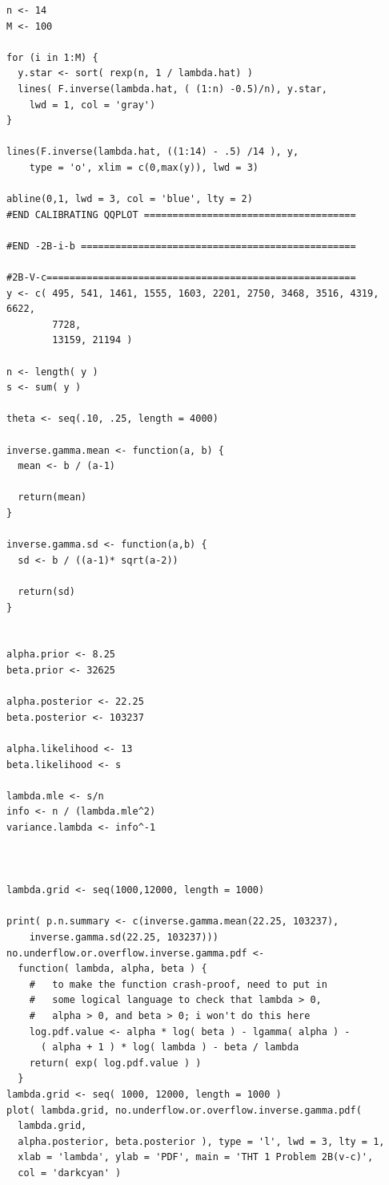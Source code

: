 \documentclass[12pt]{article}
\begin{document}
\begin{lstlisting}
n <- 14
M <- 100

for (i in 1:M) {
  y.star <- sort( rexp(n, 1 / lambda.hat) )
  lines( F.inverse(lambda.hat, ( (1:n) -0.5)/n), y.star, 
    lwd = 1, col = 'gray')
}

lines(F.inverse(lambda.hat, ((1:14) - .5) /14 ), y, 
    type = 'o', xlim = c(0,max(y)), lwd = 3)

abline(0,1, lwd = 3, col = 'blue', lty = 2)
#END CALIBRATING QQPLOT =====================================

#END -2B-i-b ================================================

#2B-V-c======================================================
y <- c( 495, 541, 1461, 1555, 1603, 2201, 2750, 3468, 3516, 4319, 6622, 
        7728,
        13159, 21194 )

n <- length( y )
s <- sum( y )

theta <- seq(.10, .25, length = 4000)

inverse.gamma.mean <- function(a, b) {
  mean <- b / (a-1)
  
  return(mean)
}

inverse.gamma.sd <- function(a,b) {
  sd <- b / ((a-1)* sqrt(a-2))
  
  return(sd)
}


alpha.prior <- 8.25
beta.prior <- 32625

alpha.posterior <- 22.25
beta.posterior <- 103237

alpha.likelihood <- 13
beta.likelihood <- s

lambda.mle <- s/n
info <- n / (lambda.mle^2)
variance.lambda <- info^-1



lambda.grid <- seq(1000,12000, length = 1000)

print( p.n.summary <- c(inverse.gamma.mean(22.25, 103237), 
    inverse.gamma.sd(22.25, 103237)))
no.underflow.or.overflow.inverse.gamma.pdf <-
  function( lambda, alpha, beta ) {
    #   to make the function crash-proof, need to put in
    #   some logical language to check that lambda > 0,
    #   alpha > 0, and beta > 0; i won't do this here
    log.pdf.value <- alpha * log( beta ) - lgamma( alpha ) -
      ( alpha + 1 ) * log( lambda ) - beta / lambda
    return( exp( log.pdf.value ) )
  }
lambda.grid <- seq( 1000, 12000, length = 1000 )
plot( lambda.grid, no.underflow.or.overflow.inverse.gamma.pdf( 
  lambda.grid,
  alpha.posterior, beta.posterior ), type = 'l', lwd = 3, lty = 1,
  xlab = 'lambda', ylab = 'PDF', main = 'THT 1 Problem 2B(v-c)',
  col = 'darkcyan' )


\end{lstlisting}
\end{document}
